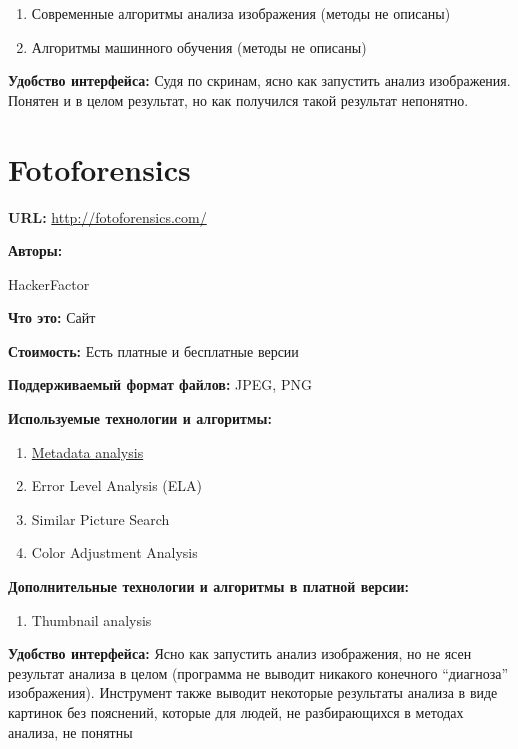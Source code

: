 \begin{enumerate}
  \item Современные алгоритмы анализа изображения (методы не описаны)
  \item Алгоритмы машинного обучения (методы не описаны)
\end{enumerate} 

\textbf{Удобство интерфейса:}
Судя по скринам, ясно как запустить анализ изображения. Понятен и в целом результат, но как получился такой результат непонятно.
  
\newpage

\section{Fotoforensics}

\textbf{URL: } \url{http://fotoforensics.com/}

\textbf{Авторы:}

HackerFactor

\textbf{Что это:} Сайт

\textbf{Стоимость:} Есть платные и бесплатные версии

\textbf{Поддерживаемый формат файлов:} JPEG, PNG

\textbf{Используемые технологии и алгоритмы:}

\begin{enumerate}
  \item \href{http://fotoforensics.com/tutorial-meta.php}{Metadata analysis}
  \item Error Level Analysis (ELA)
    
  \item Similar Picture Search
  
  \item Color Adjustment Analysis
\end{enumerate} 

\textbf{Дополнительные технологии и алгоритмы в платной версии:}
\begin{enumerate}
  \item Thumbnail analysis
\end{enumerate} 

\textbf{Удобство интерфейса:}
Ясно как запустить анализ изображения, но не ясен результат анализа в целом (программа не выводит никакого конечного “диагноза” изображения).
Инструмент также выводит некоторые результаты анализа в виде картинок без пояснений, которые для людей, не разбирающихся в методах анализа, не понятны
  
